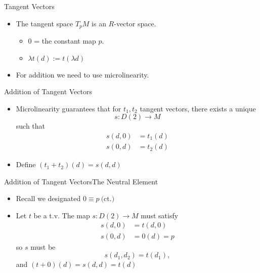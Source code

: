 \documentclass{beamer}
\begin{document}
\begin{frame}{Tangent Vectors}
  \begin{itemize}
    \item The tangent space \( T_pM \) is an \( R \)-vector space.
      \begin{itemize}
        \item \( 0 \) = the constant map \( p \).
        \item \( \lambda t(d) := t(\lambda d)\)
      \end{itemize}
    \item For addition we need to use microlinearity.
  \end{itemize}
\end{frame}

\begin{frame}{Addition of Tangent Vectors}
  \begin{itemize}
    \item Microlinearity guarantees that for \( t_1, t_2 \) tangent vectors,
      there exists a unique
      \begin{equation*}
        s:D(2)\to M
      \end{equation*}
      such that
      \begin{align*}
        s(d,0) &= t_1(d)\\
        s(0,d) &= t_2(d)
      \end{align*}
    \item Define \( (t_1 + t_2)(d) = s(d,d) \)
  \end{itemize}
\end{frame}


\begin{frame}{Addition of Tangent Vectors}{The Neutral Element}
  \begin{itemize}
    \item Recall we designated \( 0\equiv p\ \text{(ct.)} \)
    \item Let \( t \) be a t.v. The map \( s:D(2)\to M \) must satisfy
      \begin{align*}
        s(d,0) &= t(d,0)\\
        s(0,d) &= 0(d) = p
      \end{align*}
      so \( s \) must be
      \begin{equation*}
        s(d_1,d_2) = t(d_1),
      \end{equation*}
      and \( (t + 0)(d) = s(d,d) = t(d) \)
  \end{itemize}
\end{frame}
\end{document}
